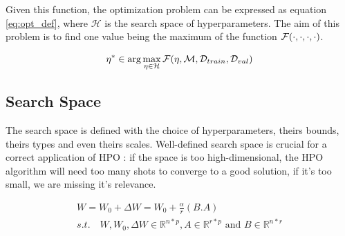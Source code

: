 \documentclass[runningheads]{llncs}
\begin{document}
Given this function, the optimization problem can be expressed as equation \ref{eq:opt_def}, where $\mathcal{H}$ is the search space of hyperparameters. The aim of this problem is to find one value being the maximum of the function $\mathcal F(\cdot\space,\space\cdot\space, \space \cdot\space, \space \cdot )$. 


\begin{equation}
    \eta^* \in \arg\max_{\eta \in \mathcal{H}} \mathcal{F}(\eta,\mathcal{M},\mathcal{D}_{train},\mathcal{D}_{val})
\label{eq:opt_def}
\end{equation}

\subsection{Search Space}
\label{sec:search_space}

The search space is defined with the choice of hyperparameters, theirs bounds, theirs types and even theirs scales.  Well-defined search space is crucial for a correct application of HPO : if the space is too high-dimensional, the HPO algorithm will need too many shots to converge to a good solution, if it's too small, we are missing it's relevance. 

\begin{equation}
    \begin{split}
    W = W_0 + \Delta W = W_0 + \frac{\alpha}{r}(B.A) \\
    s.t. \quad W,W_0,\Delta W \in \mathbb{R}^{n*p},
    A \in \mathbb{R}^{r*p} \text{ and } B \in \mathbb{R}^{n*r}
    \end{split}
    \label{eq : lora}
\end{equation}
\end{document}
